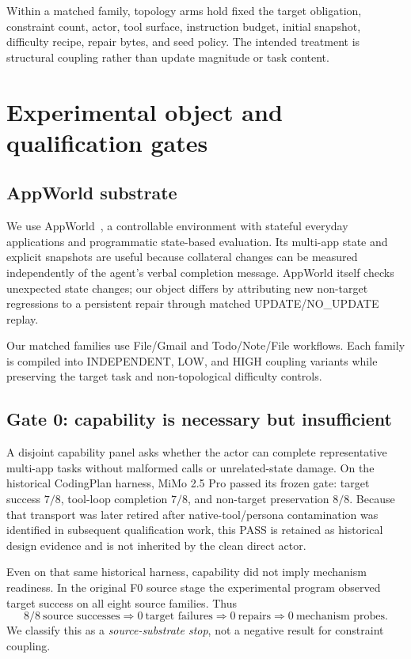 \documentclass{article}
\begin{document}
Within a matched family, topology arms hold fixed the target obligation, constraint count, actor, tool surface, instruction budget, initial snapshot, difficulty recipe, repair bytes, and seed policy. The intended treatment is structural coupling rather than update magnitude or task content.

\section{Experimental object and qualification gates}
\label{sec:gates}
\subsection{AppWorld substrate}
We use AppWorld~\citep{trivedi2024appworld}, a controllable environment with stateful everyday applications and programmatic state-based evaluation. Its multi-app state and explicit snapshots are useful because collateral changes can be measured independently of the agent's verbal completion message. AppWorld itself checks unexpected state changes; our object differs by attributing new non-target regressions to a persistent repair through matched UPDATE/NO\_UPDATE replay.

Our matched families use File/Gmail and Todo/Note/File workflows. Each family is compiled into INDEPENDENT, LOW, and HIGH coupling variants while preserving the target task and non-topological difficulty controls.

\subsection{Gate 0: capability is necessary but insufficient}
A disjoint capability panel asks whether the actor can complete representative multi-app tasks without malformed calls or unrelated-state damage. On the historical CodingPlan harness, MiMo 2.5 Pro passed its frozen gate: target success $7/8$, tool-loop completion $7/8$, and non-target preservation $8/8$. Because that transport was later retired after native-tool/persona contamination was identified in subsequent qualification work, this PASS is retained as historical design evidence and is not inherited by the clean direct actor.

Even on that same historical harness, capability did not imply mechanism readiness. In the original F0 source stage the experimental program observed target success on all eight source families. Thus
\begin{equation}
8/8\ \text{source successes}\Rightarrow 0\ \text{target failures}\Rightarrow 0\ \text{repairs}\Rightarrow 0\ \text{mechanism probes}.
\end{equation}
We classify this as a \emph{source-substrate stop}, not a negative result for constraint coupling.
\end{document}
